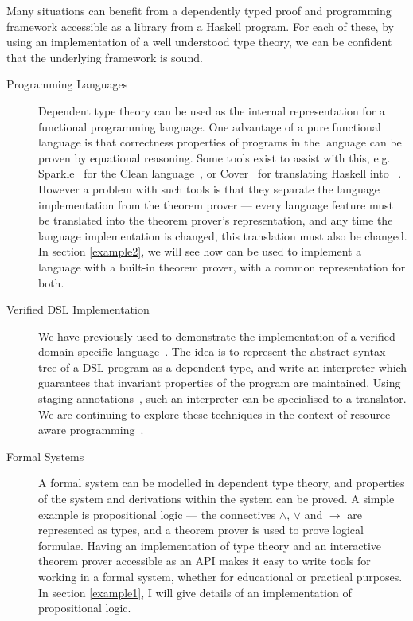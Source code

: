 Many situations can benefit from a dependently typed proof and
programming framework accessible as a library from a Haskell program.
For each of these, by using an implementation of a well understood
type theory, we can be confident that the underlying framework is
sound.

\begin{description}
\item[Programming Languages] 
Dependent type theory can be used as the internal representation for a
functional programming language. 
One advantage of a pure functional language is that correctness
properties of programs in the language can be proven by equational
reasoning.  Some tools exist to assist with this,
e.g. Sparkle~\cite{sparkle} for the Clean language~\cite{clean}, or
Cover~\cite{cover} for translating Haskell into
\Agda{}~\cite{agda}. However a problem with such tools is that they
separate the language implementation from the theorem prover --- every
language feature must be translated into the theorem prover's
representation, and any time the language implementation is changed,
this translation must also be changed.
In section
\ref{example2}, we will see how \Ivor{} can be used to implement a
language with a built-in theorem prover, with a common representation
for both.

\item[Verified DSL Implementation]
We have previously used \Ivor{} to demonstrate the implementation of
a verified domain specific language~\cite{dtpmsp-gpce}. The idea is to
represent the abstract syntax tree of a DSL program as a dependent
type, and write an interpreter which guarantees that invariant
properties of the program are maintained. Using staging
annotations~\cite{multi-taha}, such an interpreter can be specialised
to a translator. We are continuing to explore these techniques in the
context of resource aware programming~\cite{dt-framework}.

\item[Formal Systems] 

A formal system can be modelled in dependent type theory, and
properties of the system and derivations within the system can be
proved. A simple example is propositional logic --- the connectives
$\land$, $\lor$ and $\to$ are represented as types, and a theorem
prover is used to prove logical formulae.  Having an implementation of
type theory and an interactive theorem prover accessible as an API
makes it easy to write tools for working in a formal system, whether
for educational or practical purposes.  In section \ref{example1}, I
will give details of an implementation of propositional logic.

\end{description}

